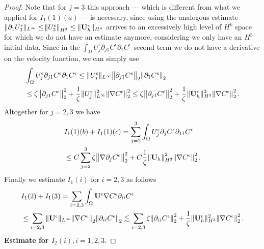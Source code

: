 \documentclass[11pt, a4paper]{article}
\begin{document}
\begin{proof}
Note that for $j=3$ this approach --- which is different from what we applied for $I_1(1)(a)$ --- is necessary, since using the analogous estimate $\| \partial_1 U_3^\epsilon \| _ {L^\infty} \leq \norm{U_3^\epsilon}_{H^3} \leq \| \mathbf{U}_h^\epsilon \| _{H^4}$ arrives to an excessively high level of $H^k$ space for which we do not have an estimate anymore, considering we only have an $H^3$ initial data. Since in the $\int_\Omega U_j^\epsilon \partial_{j1} C^\epsilon \partial_1 C^\epsilon$ second term we do not have a derivative on the velocity function, we can simply use
\begin{equation} \nonumber
\begin{split}
& \int_\Omega U_j^\epsilon \partial_{j1} C^\epsilon \partial_1 C^\epsilon \leq \| U_j^\epsilon \| _{L^\infty} \norm{\partial_{j1} C^\epsilon}_2 \norm{\partial_1 C^\epsilon}_2 \\
& \leq \zeta \norm{\partial_{j1} C^\epsilon}_2^2 + \frac{1}{\zeta} \| U_j^\epsilon \| _{L^\infty}^2 \norm{\nabla C^\epsilon}_2^2 \leq \zeta \norm{\partial_{j1} C^\epsilon}_2^2 + \frac{1}{\zeta} \| \mathbf{U}_h^\epsilon \| _{H^3}^2 \norm{\nabla C^\epsilon}_2^2. 
\end{split}
\end{equation}
Altogether for $j = 2,3$ we have
\begin{equation}
\begin{split}
& I_1(1)(b) + I_1(1)(c) = \sum_{j=2}^3 \int_\Omega U_j^\epsilon \partial_j C^\epsilon \partial_{11} C^\epsilon \\
& \leq C \sum_{j=2}^3 \zeta \norm{\nabla \partial_j C^\epsilon}_2^2 + C \frac{1}{\zeta} \norm{\mathbf{U}_h}_{H^3}^2 \norm{\nabla C^\epsilon}_2^2.
\end{split}
\end{equation}
Finally we estimate $I_1(i)$ for $i = 2,3$ as follows
%
\begin{equation}
\begin{split}
& I_1(2) + I_1(3) = \sum_{i = 2,3} \int_\Omega \mathbf{U}^\epsilon \nabla C^\epsilon \partial_{ii} C^\epsilon \\
& \leq \sum_{i = 2,3} \| \mathbf{U}^\epsilon \| _{L^\infty} \norm{\nabla C^\epsilon}_2 \norm{\partial_{ii}C^\epsilon}_2 \lesssim \sum_{i = 2,3} \zeta \norm{\partial_{ii} C^\epsilon}_2^2 + \frac{1}{\zeta} \| \mathbf{U}_h^\epsilon \| _ {H^3} ^ 2 \norm{\nabla C^\epsilon}_2^2. \raisetag{50pt}
\end{split}
\end{equation}
%
\textbf{Estimate for $I_2(i), i=1,2,3.$}


\end{proof}
\end{document}
